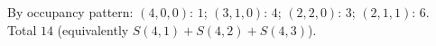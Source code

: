 By occupancy pattern: $(4,0,0)$: $1$; $(3,1,0)$: $4$; $(2,2,0)$: $3$; $(2,1,1)$: $6$. Total $\boxed{14}$ (equivalently $S(4,1)+S(4,2)+S(4,3)$).
